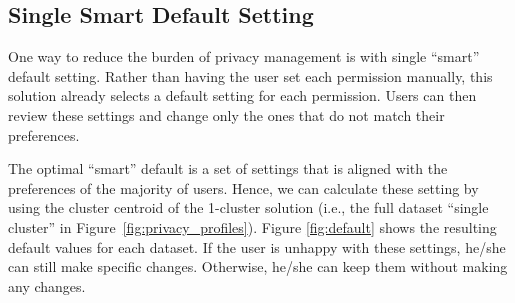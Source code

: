 \subsection{Single Smart Default Setting}


One way to reduce the burden of privacy management is with single ``smart'' default setting. Rather than having the user set each permission manually, this solution already selects a default setting for each permission. Users can then review these settings and change only the ones that do not match their preferences.

The optimal ``smart'' default is a set of settings that is aligned with the preferences of the majority of users. Hence, we can calculate these setting by using the cluster centroid of the 1-cluster solution (i.e., the full dataset ``single cluster'' in Figure~\ref{fig:privacy_profiles}). Figure \ref{fig:default} shows the resulting default values for each dataset. If the user is unhappy with these settings, he/she can still make specific changes. Otherwise, he/she can keep them without making any changes. 

